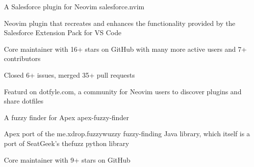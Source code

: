 

\begin{cventries}

  \cventry
    {A Salesforce plugin for Neovim} 
    {salesforce.nvim} 
    {} %
    {} %
    {
      \begin{cvitems} %
        \item {Neovim plugin that recreates and enhances the functionality provided by the Salesforce Extension Pack for VS Code}
        \item {Core maintainer with 16+ stars on GitHub with many more active users and 7+ contributors}
        \item {Closed 6+ issues, merged 35+ pull requests}
        \item {Featurd on dotfyle.com, a community for Neovim users to discover plugins and share dotfiles}
      \end{cvitems}
    }

  \cventry
    {A fuzzy finder for Apex} 
    {apex-fuzzy-finder} 
    {} %
    {} %
    {
      \begin{cvitems} %
        \item {Apex port of the me.xdrop.fuzzywuzzy fuzzy-finding Java library, which itself is a port of SeatGeek's thefuzz python library}
        \item {Core maintainer with 9+ stars on GitHub}
      \end{cvitems}
    }

\end{cventries}
